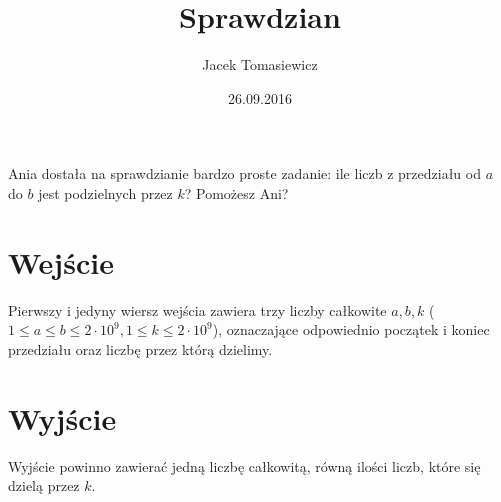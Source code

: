 \documentclass[zad,zawodnik,utf8]{sinol}
\title{Sprawdzian}
\author{Jacek Tomasiewicz}
\date{26.09.2016}
\begin{document}
  \begin{tasktext}%
Ania dostała na sprawdzianie bardzo proste zadanie: ile liczb z przedziału od $a$ do $b$ jest  podzielnych przez $k$? Pomożesz Ani?

  \section{Wejście}
Pierwszy i jedyny wiersz wejścia zawiera trzy liczby całkowite $a, b, k$ ($1 \leq a \leq b \leq 2 \cdot 10^9, 1  \leq k \leq 2 \cdot 10^9$), oznaczające odpowiednio początek i koniec przedziału oraz liczbę przez  którą dzielimy.

  \section{Wyjście}
Wyjście powinno zawierać jedną liczbę całkowitą, równą ilości liczb, które się dzielą przez $k$.

     \makecompactexample

  \end{tasktext}
\end{document}

